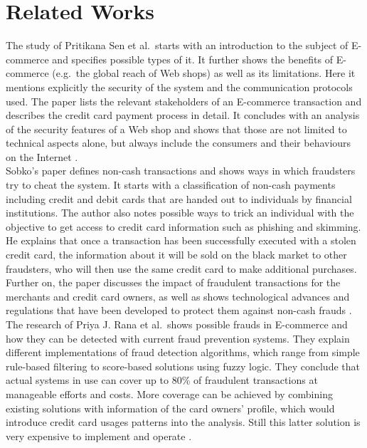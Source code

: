 
\chapter{Related Works}
\label{cha:related_works}

The study of Pritikana Sen et al.\ starts with an introduction to the subject of \gls{E-commerce} and specifies possible types of it. It further shows the benefits of \gls{E-commerce} (e.g.\ the global reach of Web shops) as well as its limitations. Here it mentions explicitly the security of the system and the communication protocols used. The paper lists the relevant stakeholders of an \gls{E-commerce} transaction and describes the credit card payment process in detail. It concludes with an analysis of the security features of a Web shop and shows that those are not limited to technical aspects alone, but always include the consumers and their behaviours on the Internet \citep{sen2015study}. \\

Sobko's paper defines non-cash transactions and shows ways in which fraudsters try to cheat the system. It starts with a classification of non-cash payments including credit and debit cards that are handed out to individuals by financial institutions. The author also notes possible ways to trick an individual with the objective to get access to credit card information such as phishing and skimming. He explains that once a transaction has been successfully executed with a stolen credit card, the information about it will be sold on the black market to other fraudsters, who will then use the same credit card to make additional purchases. Further on, the paper discusses the impact of fraudulent transactions for the merchants and credit card owners, as well as shows technological advances and regulations that have been developed to protect them against non-cash frauds \citep{sobko2014fraud}. \\

The research of Priya J. Rana et al.\ shows possible frauds in \gls{E-commerce} and how they can be detected with current fraud prevention systems. They explain different implementations of fraud detection algorithms, which range from simple rule-based filtering to score-based solutions using fuzzy logic. They conclude that actual systems in use can cover up to 80\% of fraudulent transactions at manageable efforts and costs. More coverage can be achieved by combining existing solutions with information of the card owners' profile, which would introduce credit card usages patterns into the analysis. Still this latter solution is very expensive to implement and operate \citep{rana2015survey}. \\

